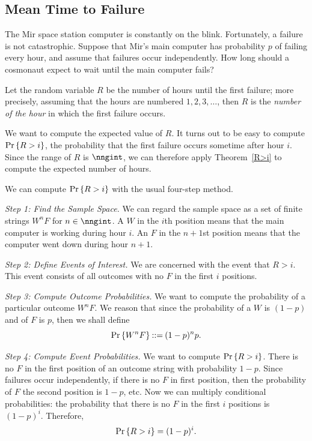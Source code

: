 \documentclass[11pt,twoside]{article}
\begin{document}
\subsection{Mean Time to Failure}

The Mir space station computer is constantly on the blink.  Fortunately, a
failure is not catastrophic.  Suppose that Mir's main computer has
probability $p$ of failing every hour, and assume that failures occur
independently.  How long should a cosmonaut expect to wait until the main
computer fails?

Let the random variable $R$ be the number of hours until the first
failure; more precisely, assuming that the hours are numbered $1, 2, 3,
\ldots$, then $R$ is the \emph{number of the hour} in which the first
failure occurs.

We want to compute the expected value of $R$.  It turns out to be easy to
compute $\mathop{\textup{Pr}}\nolimits\left\{R > i\right\}$, the probability that the first failure occurs
sometime after hour $i$.  Since the range of $R$ is $\nngint$, we can
therefore apply Theorem~\ref{R>i} to compute the expected number of hours.

We can compute $\mathop{\textup{Pr}}\nolimits\left\{R > i\right\}$ with the usual four-step method.

{\em Step 1: Find the Sample Space.} We can regard the sample space as a
set of finite strings $W^nF$ for $n \in \nngint$.  A $W$ in the $i$th
position means that the main computer is working during hour $i$.  An $F$
in the $n+1$st position means that the computer went down during hour
$n+1$.

{\em Step 2: Define Events of Interest.} We are concerned with the
event that $R > i$.  This event consists of all outcomes with no $F$
in the first $i$ positions.

{\em Step 3: Compute Outcome Probabilities.} We want to compute the
probability of a particular outcome $W^nF$.  We reason that since the
probability of a $W$ is $(1-p)$ and of $F$ is $p$, then we shall define
\[
\mathop{\textup{Pr}}\nolimits\left\{W^nF\right\} \mathbin{::=} (1-p)^np.
\]

{\em Step 4: Compute Event Probabilities.}  We want to compute $\mathop{\textup{Pr}}\nolimits\left\{R >
i\right\}$.  There is no $F$ in the first position of an outcome string with
probability $1-p$.  Since failures occur independently, if there is no $F$
in first position, then the probability of $F$ the second position is
$1-p$, etc.  Now we can multiply conditional probabilities: the
probability that there is no $F$ in the first $i$ positions is $(1-p)^i$.
Therefore,
\begin{equation}\label{pR>i}
\mathop{\textup{Pr}}\nolimits\left\{R > i\right\} = (1-p)^i.
\end{equation}
\end{document}
